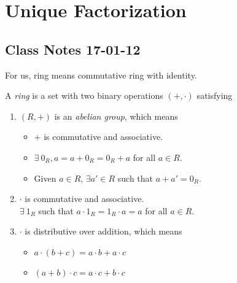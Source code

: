 \documentclass{mynotes}
\begin{document}
\tableofcontents
\chapter{Unique Factorization}
\section{Class Notes 17-01-12}
For us, ring means commutative ring with identity.
\begin{definition}
A \emph{ring} is a set with two binary operations $(+,\cdot)$ satisfying
\begin{enumerate}
\item $(R,+)$ is an \emph{abelian group}, which means
\begin{itemize}
\item $+$ is commutative and associative.
\item $\exists\ 0_R, a=a+0_R=0_R+a$ for all $a\in R$.
\item Given $a\in R$, $\exists a'\in R$ such that $a+a'=0_R$.
\end{itemize}
\item 
$\cdot$ is commutative and associative.\\
$\exists\ 1_R$ such that $a\cdot 1_R=1_R\cdot a =a$ for all $a\in R$.
\item $\cdot$ is distributive over addition, which means
\begin{itemize}
\item $a\cdot(b+c) = a\cdot b+a\cdot c$
\item $(a+b)\cdot c = a\cdot c +b\cdot c$
\end{itemize}
\end{enumerate}
\end{definition}
\end{document}
